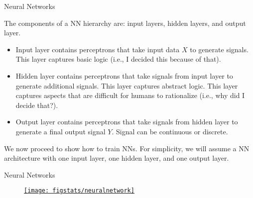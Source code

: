 \documentclass[9pt]{beamer}
\begin{document}

\begin{frame}{Neural Networks}

The components of a NN hierarchy are: input layers,  hidden layers, and output layer.
\begin{block}{}
\begin{itemize}
   \setlength{\itemsep}{10pt}
\item Input layer contains perceptrons that take input data $X$ to generate signals. This layer captures basic logic (i.e., I decided  this because of that). 
\item Hidden layer contains perceptrons that take signals from input layer to generate additional signals. This layer captures abstract logic. This layer captures aspects that are difficult for humans to rationalize (i.e., why did I decide that?). 
\item Output layer contains perceptrons that take signals from hidden layer to generate a final output signal $Y$. Signal can be continuous or discrete. 
\end{itemize}
\end{block}
We now proceed to show how to train NNs. For simplicity, we will assume a NN architecture with one input layer, one hidden layer, and one output layer. 

\end{frame}


\begin{frame}{Neural Networks}

\begin{figure}[!htb]
    \centering
	\href{https://www.neuraldesigner.com/learning/tutorials/neural-network}{\texttt{[image: figstats/neuralnetwork]}}
\end{figure}

\end{frame}

\end{document}
